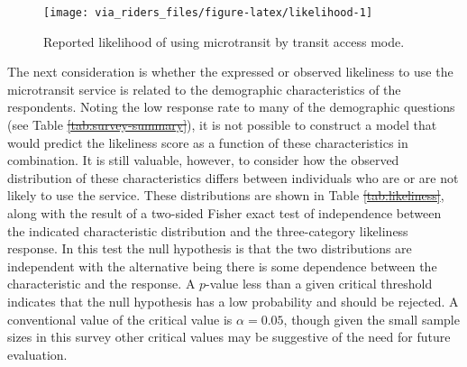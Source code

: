 \documentclass[smartcities,article,submit,moreauthors,pdftex]{mdpi} %
\providecommand{\DIFadd}[1]{{\protect\color{blue}\uwave{#1}}} %
\providecommand{\DIFdel}[1]{{\protect\color{red}\sout{#1}}}                      %
\providecommand{\DIFaddbegin}{} %
\providecommand{\DIFaddend}{} %
\providecommand{\DIFdelbegin}{} %
\providecommand{\DIFdelend}{} %
\providecommand{\DIFaddbeginFL}{} %
\providecommand{\DIFaddendFL}{} %
\providecommand{\DIFdelbeginFL}{} %
\providecommand{\DIFdelendFL}{} %
\begin{document}
\begin{figure}
\DIFdelbeginFL %
\DIFdelendFL \DIFaddbeginFL \texttt{[image: via\_riders\_files/figure-latex/likelihood-1]} \DIFaddendFL \caption{Reported likelihood of using microtransit by transit access mode.}\label{fig:likelihood}
\end{figure}

The next consideration is whether the expressed or observed likeliness to use
the microtransit service is related to the demographic characteristics of the
respondents. Noting the low response rate to many of the demographic questions
(see Table \DIFdelbegin \DIFdel{\ref{tab:survey-summary}}\DIFdelend \DIFaddbegin \DIFadd{\ref{tab:survey-respondents}}\DIFaddend ), it is not possible to construct a model
that would predict the likeliness score as a function of these characteristics
in combination. It is still valuable, however, to consider how the observed
distribution of these characteristics differs between individuals who are or are
not likely to use the service. These distributions are shown in Table
\DIFdelbegin \DIFdel{\ref{tab:likeliness}}\DIFdelend \DIFaddbegin \DIFadd{\ref{tab:fisher-table}}\DIFaddend , along with the result of a two-sided Fisher exact test of
independence between the indicated characteristic distribution and the
three-category likeliness response. In this test the null hypothesis is that the
two distributions are independent with the alternative being there is some
dependence between the characteristic and the response. A \DIFdelbegin \DIFdel{$p$}\DIFdelend \DIFaddbegin \DIFadd{\(p\)}\DIFaddend -value less than a
given critical threshold indicates that the null hypothesis has a low
probability and should be rejected. A conventional value of the critical value
is \DIFdelbegin \DIFdel{$\alpha=0.05$}\DIFdelend \DIFaddbegin \DIFadd{\(\alpha=0.05\)}\DIFaddend , though given the small sample sizes in this survey other
critical values may be suggestive of the need for future evaluation.
\end{document}
